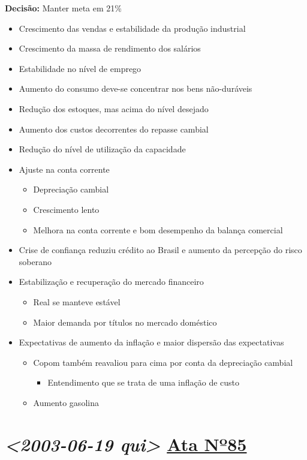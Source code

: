 \documentclass[11pt]{article}
\begin{document}
\textbf{Decisão:} Manter meta em 21\%
\begin{itemize}
\item Crescimento das vendas e estabilidade da produção industrial
\item Crescimento da massa de rendimento dos salários
\item Estabilidade no nível de emprego
\item Aumento  do consumo deve-se concentrar nos bens não-duráveis
\item Redução dos estoques, mas acima do nível desejado
\item Aumento dos custos decorrentes do repasse cambial
\item Redução do nível de utilização da capacidade
\item Ajuste na conta corrente
\begin{itemize}
\item Depreciação cambial
\item Crescimento lento
\item Melhora na conta corrente e bom desempenho da balança comercial
\end{itemize}
\item Crise de confiança reduziu crédito ao Brasil e aumento da percepção do risco soberano
\item Estabilização e recuperação do mercado financeiro
\begin{itemize}
\item Real se manteve estável
\item Maior demanda por títulos no mercado doméstico
\end{itemize}
\item Expectativas de aumento da inflação e maior dispersão das expectativas
\begin{itemize}
\item Copom também reavaliou para cima por conta da depreciação cambial
\begin{itemize}
\item Entendimento que se trata de uma inflação de custo
\end{itemize}
\item Aumento gasolina
\end{itemize}
\end{itemize}

\section*{\textit{<2003-06-19 qui> } \href{https://www.bcb.gov.br/publicacoes/atascopom/01062003}{Ata Nº85}}
\label{sec:org3763141}
\end{document}
